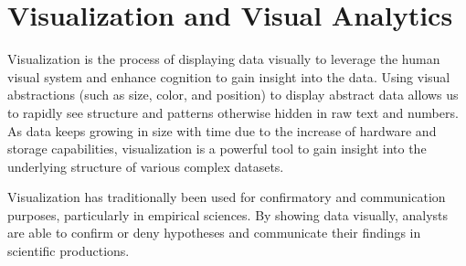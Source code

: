 

\section{Visualization and Visual Analytics}

Visualization is the process of displaying data visually to leverage the human visual system and enhance cognition to gain insight into the data\cite{cardReadingsInformationVisualization1999}.
Using visual abstractions (such as size, color, and position) to display abstract data allows us to rapidly see structure and patterns otherwise hidden in raw text and numbers.
As data keeps growing in size with time due to the increase of hardware and storage capabilities, visualization is a powerful tool to gain insight into the underlying structure of various complex datasets.

Visualization has traditionally been used for confirmatory and communication purposes, particularly in empirical sciences.
By showing data visually, analysts are able to confirm or deny hypotheses and communicate their findings in scientific productions.


